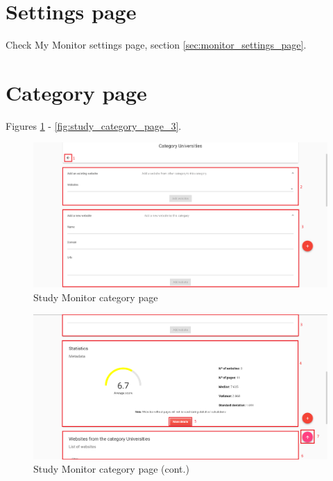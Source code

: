 \section{Settings page}

Check My Monitor settings page, section \ref{sec:monitor_settings_page}.

\section{Category page}

Figures \ref{fig:study_category_page} - \ref{fig:study_category_page_3}.

\begin{figure}[H]
    \centering
    \includegraphics[width=\linewidth]{lib/images/study/study_category_page.png}
    \caption{Study Monitor category page}
    \label{fig:study_category_page}
\end{figure}

\clearpage

\begin{figure}[H]
    \centering
    \includegraphics[width=\linewidth]{lib/images/study/study_category_page_2.png}
    \caption{Study Monitor category page (cont.)}
    \label{fig:study_category_page_2}
\end{figure}

